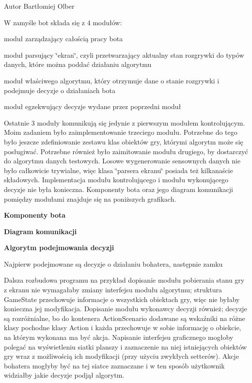\begin{DoxyAuthor}{Autor}
Bartłomiej Olber
\end{DoxyAuthor}
W zamyśle bot składa się z 4 modułów\+:
\begin{DoxyItemize}
\item moduł zarządzający całością pracy bota
\item moduł parsujący \char`\"{}ekran\char`\"{}, czyli przetwarzający aktualny stan rozgrywki do typów danych, które można poddać działaniu algorytmu
\item moduł właściwego algorytmu, który otrzymuje dane o stanie rozgrywki i podejmuje decyzje o działaniach bota
\item moduł egzekwujący decyzje wydane przez poprzedni moduł
\end{DoxyItemize}

Ostatnie 3 moduły komunikują się jedynie z pierwszym modułem kontrolującym. Moim zadaniem było zaimplementowanie trzeciego modułu. Potrzebne do tego było jeszcze zdefiniowanie zestawu klas obiektów gry, którymi algorytm może się posługiwać. Potrzebne również było zaimitowanie modułu drugiego, by dostarczyć do algorytmu danych testowych. Losowe wygenerowanie sensownych danych nie było całkowicie trywialne, więc klasa \char`\"{}parsera ekranu\char`\"{} posiada też kilkanaście składowych. Implementacja modułu kontrolującego i modułu wykonującego decyzje nie była konieczna. Komponenty bota oraz jego diagram komunikacji pomiędzy modułami znajduje się na poniższych grafikach.

{\bfseries Komponenty bota}



{\bfseries Diagram komunikacji}



{\bfseries Algorytm podejmowania decyzji}

Najpierw podejmowane są decyzje o działaniu bohatera, następnie zamku





Dalsza rozbudowa programu na przykład dopisanie modułu pobierania stanu gry z ekranu nie wymagałaby zmiany interfejsu modułu algorytmu; struktura Game\+State przechowuje informacje o wszystkich obiektach gry, więc nie byłaby konieczna jej modyfikacja. Dopisanie modułu wykonawcy decyzji również; decyzje są rozróżnialne, bo do kontenera Action\+Scenario dodawane są wskaźniki na różne klasy pochodne klasy Action i każda przechowuje w sobie informację o obiekcie, na którym wykonana ma być akcja. Napisanie interfejsu graficznego mogłoby polegać na wyświetleniu siatki planszy i zaznaczenie na niej istniejących obiektów gry wraz z możliwością ich modyfikacji (przy użyciu zwykłych setterów). Akcje bohatera mogłyby być na tej siatce zaznaczane i w ten sposób użytkownik widziałby jakie decyzje podjął algorytm. 